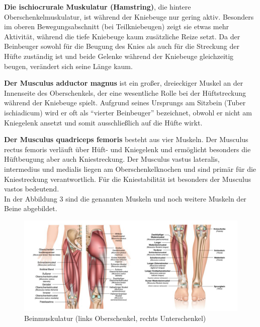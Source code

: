 \noindent \textbf{Die ischiocrurale Muskulatur (Hamstring)}, die hintere Oberschenkelmuskulatur, ist während der Kniebeuge nur gering aktiv. Besonders im oberen Bewegungsabschnitt (bei Teilkniebeugen) zeigt sie etwas mehr Aktivität, während die tiefe Kniebeuge kaum zusätzliche Reize setzt. Da der Beinbeuger sowohl für die Beugung des Knies als auch für die Streckung der Hüfte zuständig ist und beide Gelenke während der Kniebeuge gleichzeitig beugen, verändert sich seine Länge kaum. \cite{Meinart}

\noindent \textbf{Der Musculus adductor magnus} ist ein großer, dreieckiger Muskel an der Innenseite des Oberschenkels, der eine wesentliche Rolle bei der Hüftstreckung während der Kniebeuge spielt. Aufgrund seines Ursprungs am Sitzbein (Tuber ischiadicum) wird er oft als “vierter Beinbeuger” bezeichnet, obwohl er nicht am Kniegelenk ansetzt und somit ausschließlich auf die Hüfte wirkt. \cite{Meinart}

\noindent \textbf{Der Musculus quadriceps femoris} besteht aus vier Muskeln. Der Musculus rectus femoris verläuft über Hüft- und Kniegelenk und ermöglicht besonders die Hüftbeugung aber auch Kniestreckung. Der Musculus vastus lateralis, intermedius und medialis liegen am Oberschenkelknochen und sind primär für die Kniestreckung verantwortlich. Für die Kniestabilität ist besonders der Musculus vastos bedeutend. \cite{Meinart}
\\
\noindent In der Abbildung 3 sind die genannten Muskeln und noch weitere Muskeln der Beine abgebildet. 
\\
\begin{figure}[ht]\centering
\includegraphics[width=1\linewidth]{images/Muskeln.jpeg}
\caption{Beinmuskulatur (links Oberschenkel, rechts Unterschenkel)\cite{GorillaSports_Beintraining}}
\label{fig: Beinkuskulatur}
\end{figure}
\\
\\
\\
